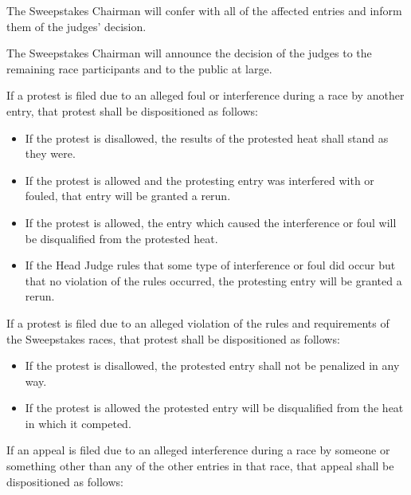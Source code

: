 	The Sweepstakes Chairman will confer with all of the affected entries and
	inform them of the judges' decision.

	The Sweepstakes Chairman will announce the decision of the judges to the
	remaining race participants and to the public at large.
	\newline

	\noindent If a protest is filed due to an alleged foul or interference during a race by
	another entry, that protest shall be dispositioned as follows:

	\begin{itemize}

		\item
		If the protest is disallowed, the results of the protested heat shall stand as
		they were.

		\item
		If the protest is allowed and the protesting entry was interfered with or
		fouled, that entry will be granted a rerun.

		\item
		If the protest is allowed, the entry which caused the interference or foul will
		be disqualified from the protested heat.

		\item
		If the Head Judge rules that some type of interference or foul did occur but
		that no violation of the rules occurred, the protesting entry will be granted a
		rerun.

	\end{itemize}

	\noindent If a protest is filed due to an alleged violation of the rules and requirements
	of the Sweepstakes races, that protest shall be dispositioned as follows:

	\begin{itemize}

		\item
		If the protest is disallowed, the protested entry shall not be penalized in any
		way.

		\item
		If the protest is allowed the protested entry will be disqualified from the
		heat in which it competed.

	\end{itemize}

	\noindent If an appeal is filed due to an alleged interference during a race by someone
	or something other than any of the other entries in that race, that appeal
	shall be dispositioned as follows:


